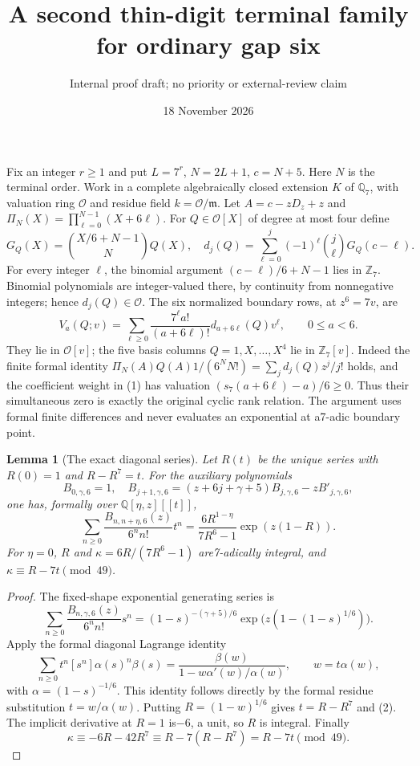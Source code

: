 \documentclass[11pt]{article}
\title{A second thin-digit terminal family for ordinary gap six}
\author{Internal proof draft; no priority or external-review claim}
\date{18 November 2026}
\newtheorem{lemma}{Lemma}
\begin{document}
\setlength{\emergencystretch}{1em}\maketitle
Fix an integer $r\ge1$ and put $L=7^r$, $N=2L+1$, $c=N+5$.
Here $N$ is the terminal order.
Work in a complete algebraically closed extension $K$ of
$\mathbb Q_7$, with valuation ring $\mathcal O$ and residue
field $k=\mathcal O/\mathfrak m$.
Let $A=c-zD_z+z$ and
$\Pi_N(X)=\prod_{\ell=0}^{N-1}(X+6\ell)$.
For $Q\in\mathcal O[X]$ of degree at most four define
\[
 G_Q(X)=\binom{X/6+N-1}{N}Q(X),\quad
 d_j(Q)=\sum_{\ell=0}^j(-1)^\ell\binom j\ell G_Q(c-\ell).
\]
For every integer $\ell$, the binomial argument
$(c-\ell)/6+N-1$ lies in $\mathbb Z_7$.
Binomial polynomials are integer-valued there, by continuity
from nonnegative integers; hence $d_j(Q)\in\mathcal O$.
The six normalized boundary rows, at $z^6=7v$, are
\[
 V_a(Q;v)=\sum_{\ell\ge0}
       \frac{7^\ell a!}{(a+6\ell)!}d_{a+6\ell}(Q)v^\ell,
                     \qquad0\le a<6.                    \tag{1}
\]
They lie in $\mathcal O[v]$; the five basis columns
$Q=1,X,\ldots,X^4$ lie in $\mathbb Z_7[v]$.
Indeed the finite formal identity
$\Pi_N(A)Q(A)1/(6^NN!)=\sum_jd_j(Q)z^j/j!$ holds, and
the coefficient weight in (1) has valuation
$(s_7(a+6\ell)-a)/6\ge0$.
Thus their simultaneous zero is exactly the original cyclic rank
relation. The argument uses formal finite differences and never
evaluates an exponential at a7-adic boundary point.

\begin{lemma}[The exact diagonal series]\label{lem:diagonal}
Let $R(t)$ be the unique series with $R(0)=1$ and $R-R^7=t$.
For the auxiliary polynomials
\[
 B_{0,\gamma,6}=1,\quad
 B_{j+1,\gamma,6}=(z+6j+\gamma+5)B_{j,\gamma,6}
                                      -zB'_{j,\gamma,6},
\]
one has, formally over $\mathbb Q[\eta,z][[t]]$,
\[
 \sum_{n\ge0}\frac{B_{n,n+\eta,6}(z)}{6^n n!}t^n
 =\frac{6R^{1-\eta}}{7R^6-1}\exp(z(1-R)).                \tag{2}
\]
For $\eta=0$, $R$ and $\kappa=6R/(7R^6-1)$ are7-adically integral,
and $\kappa\equiv R-7t\pmod{49}$.
\end{lemma}
\begin{proof}
The fixed-shape exponential generating series is
\[
 \sum_{n\ge0}\frac{B_{n,\gamma,6}(z)}{6^nn!}s^n
 =(1-s)^{-(\gamma+5)/6}
                \exp\bigl(z(1-(1-s)^{1/6})\bigr).
\]
Apply the formal diagonal Lagrange identity
\[
 \sum_{n\ge0}t^n[s^n]\alpha(s)^n\beta(s)
       =\frac{\beta(w)}{1-w\alpha'(w)/\alpha(w)},
       \qquad w=t\alpha(w),
\]
with $\alpha=(1-s)^{-1/6}$.
This identity follows directly by the formal residue substitution
$t=w/\alpha(w)$.
Putting $R=(1-w)^{1/6}$ gives $t=R-R^7$ and (2).
The implicit derivative at $R=1$ is$-6$, a unit, so $R$ is integral.
Finally
\[
 \kappa\equiv-6R-42R^7
             \equiv R-7(R-R^7)=R-7t\pmod{49}.
\]
\end{proof}
\end{document}
